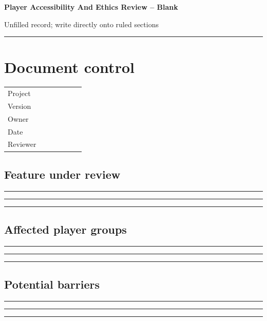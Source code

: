 \documentclass[11pt]{article}
\begin{document}
{\huge\bfseries\color{suiteblue} Player Accessibility And Ethics Review -- Blank}\par
\vspace{0.15in}
{\normalsize\color{suitegray} Unfilled record; write directly onto ruled sections}\par
\vspace{0.15in}\hrule\vspace{0.15in}

\section{Document control}
\renewcommand{\arraystretch}{1.8}
\begin{tabularx}{\linewidth}{@{}p{0.30\linewidth}X@{}}\toprule
Project & \hrulefill\\ Version & \hrulefill\\ Owner & \hrulefill\\ Date & \hrulefill\\ Reviewer & \hrulefill\\ \bottomrule\end{tabularx}

\subsection{Feature under review}
\noindent\rule{\linewidth}{0.3pt}\par\vspace{0.18in}
\noindent\rule{\linewidth}{0.3pt}\par\vspace{0.18in}
\noindent\rule{\linewidth}{0.3pt}\par\vspace{0.14in}

\subsection{Affected player groups}
\noindent\rule{\linewidth}{0.3pt}\par\vspace{0.18in}
\noindent\rule{\linewidth}{0.3pt}\par\vspace{0.18in}
\noindent\rule{\linewidth}{0.3pt}\par\vspace{0.14in}

\subsection{Potential barriers}
\noindent\rule{\linewidth}{0.3pt}\par\vspace{0.18in}
\noindent\rule{\linewidth}{0.3pt}\par\vspace{0.18in}
\noindent\rule{\linewidth}{0.3pt}\par\vspace{0.14in}
\end{document}
